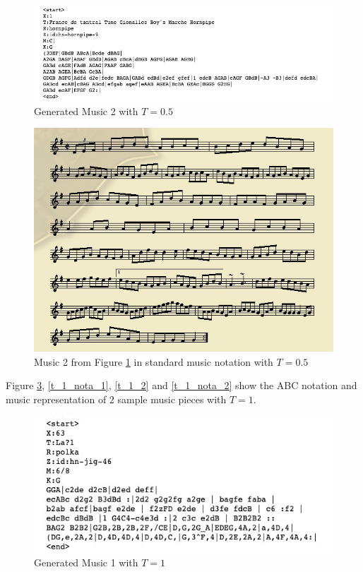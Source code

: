 \documentclass{article}
\begin{document}
\begin{figure}[H]
\begin{center}
  \centering
  \includegraphics[width=5in]{image/t_05_2.png}
\end{center}
\caption{Generated Music 2 with $T=0.5$}
\label{t_0.5_2}
\end{figure}

\begin{figure}[H]
\begin{center}
  \centering
  \includegraphics[width=4.5in]{image/t_05_2_nota.png}
\end{center}
\caption{Music 2 from Figure \ref{t_0.5_2} in standard music notation with $T=0.5$}
\label{t_0.5_nota_2}
\end{figure}

Figure \ref{t_1_1}, \ref{t_1_nota_1}, \ref{t_1_2} and \ref{t_1_nota_2} show the ABC notation and music representation of $2$ sample music pieces with $T=1$.

\begin{figure}[H]
\begin{center}
  \centering
  \includegraphics[width=5in]{image/t_1_1.png}
\end{center}
\caption{Generated Music 1 with $T=1$}
\label{t_1_1}
\end{figure}
\end{document}
